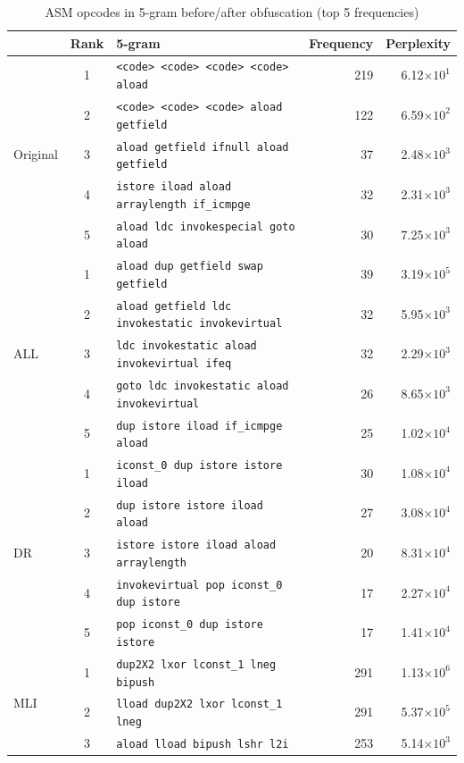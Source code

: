 \documentclass[conference]{IEEEtran}
\begin{document}
\begin{table}[t]
  \centering
  \caption{ASM opcodes in 5-gram before/after obfuscation (top 5 frequencies)}\label{table:5gram}
  {\footnotesize
  \begin{tabular}{lc|l|r|r}
    & \textbf{Rank} & \textbf{5-gram} & \textbf{Frequency} & \textbf{Perplexity} \\ \hline
\multirow{5}{*}{{Original}}
& 1 & \verb!<code> <code> <code> <code> aload        ! &  219 & 6.12$\times10^1$ \\
& 2 & \verb!<code> <code> <code> aload getfield      ! &  122 & 6.59$\times10^2$ \\
& 3 & \verb!aload getfield ifnull aload getfield     ! &   37 & 2.48$\times10^3$ \\
& 4 & \verb!istore iload aload arraylength if_icmpge ! &   32 & 2.31$\times10^3$ \\
& 5 & \verb!aload ldc invokespecial goto aload       ! &   30 & 7.25$\times10^3$ \\ \hline
\multirow{5}{*}{{ALL}}
& 1 & \verb!aload dup getfield swap getfield               ! &  39 & 3.19$\times10^5$ \\
& 2 & \verb!aload getfield ldc invokestatic invokevirtual ! &  32 & 5.95$\times10^3$ \\
& 3 & \verb!ldc invokestatic aload invokevirtual ifeq     ! &  32 & 2.29$\times10^3$ \\
& 4 & \verb!goto ldc invokestatic aload invokevirtual     ! &  26 & 8.65$\times10^3$ \\
& 5 & \verb!dup istore iload if_icmpge aload              ! &  25 & 1.02$\times10^4$ \\ \hline
\multirow{5}{*}{{DR}}
& 1 & \verb!iconst_0 dup istore istore iload       ! & 30 & 1.08$\times10^4$ \\
& 2 & \verb!dup istore istore iload aload          ! & 27 & 3.08$\times10^4$ \\
& 3 & \verb!istore istore iload aload arraylength  ! & 20 & 8.31$\times10^4$ \\
& 4 & \verb!invokevirtual pop iconst_0 dup istore  ! & 17 & 2.27$\times10^4$ \\
& 5 & \verb!pop iconst_0 dup istore istore         ! & 17 & 1.41$\times10^4$ \\ \hline
\multirow{5}{*}{{MLI}}
& 1 & \verb!dup2X2 lxor lconst_1 lneg bipush ! & 291 & 1.13$\times10^6$ \\
& 2 & \verb!lload dup2X2 lxor lconst_1 lneg  ! & 291 & 5.37$\times10^5$ \\
& 3 & \verb!aload lload bipush lshr l2i      ! & 253 & 5.14$\times10^3$ \\

\end{tabular}}
\end{table}
\end{document}
